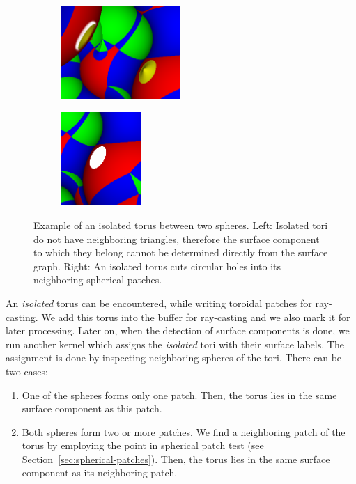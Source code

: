 \begin{figure}[htp]
  \centering
  \begin{subfigure}[t]{0.55\columnwidth}
    \centering
    \includegraphics[height=1.4in]{image/isolated-cutaway2.png}
		\label{fig:isolated-cutaway}
  \end{subfigure}%
  \quad
  \begin{subfigure}[t]{0.4\columnwidth}
    \centering
    \includegraphics[height=1.4in]{image/isolated-hole.png}
		\label{fig:isolated-hole}
  \end{subfigure}
\caption{Example of an isolated torus between two spheres.
	Left: Isolated tori do not have neighboring triangles, therefore the surface component to which they belong cannot be determined directly from the surface graph. 	Right: An isolated torus cuts circular holes into its neighboring spherical patches.}
\end{figure}

An \textit{isolated} torus can be encountered, while writing toroidal patches for ray-casting.
We add this torus into the buffer for ray-casting and we also mark it for later processing.
Later on, when the detection of surface components is done, we run another kernel which assigns the \textit{isolated} tori with their surface labels.
The assignment is done by inspecting neighboring spheres of the tori.
There can be two cases:
\begin{enumerate}
  \item One of the spheres forms only one patch. Then, the torus lies in the same surface component as this patch.
	\item Both spheres form two or more patches. We find a neighboring patch of the torus by employing the point in spherical patch test (see Section~\ref{sec:spherical-patches}). Then, the torus lies in the same surface component as its neighboring patch.
\end{enumerate}

